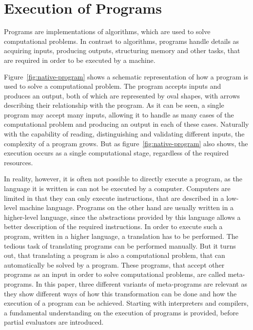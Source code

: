 
\section{Execution of Programs}\label{chap:programs}


Programs are implementations of algorithms, which are used to solve computational problems.
In contrast to algorithms, programs handle details as acquiring inputs, producing outputs, structuring memory and other tasks, that are required in order to be executed by a machine.

Figure~\ref{fig:native-program} shows a schematic representation of how a program is used to solve a computational problem.
The program accepts inputs and produces an output, both of which are represented by oval shapes, with arrows describing their relationship with the program.
As it can be seen, a single program may accept many inputs, allowing it to handle as many cases of the computational problem and producing an output in each of these cases.
Naturally with the capability of reading, distinguishing and validating different inputs, the complexity of a program grows.
But as figure~\ref{fig:native-program} also shows, the execution occurs as a single computational stage, regardless of the required resources.

In reality, however, it is often not possible to directly execute a program, as the language it is written is can not be executed by a computer.
Computers are limited in that they can only execute instructions, that are described in a low-level machine language.
Programs on the other hand are usually written in a higher-level language, since the abstractions provided by this language allows a better description of the required instructions.
In order to execute such a program, written in a higher language, a translation has to be performed.
The tedious task of translating programs can be performed manually.
But it turns out, that translating a program is also a computational problem, that can automatically be solved by a program.
These programs, that accept other programs as an input in order to solve computational problems, are called meta-programs.
In this paper, three different variants of meta-programs are relevant as they show different ways of how this transformation can be done and how the execution of a program can be achieved.
Starting with interpreters and compilers, a fundamental understanding on the execution of programs is provided, before partial evaluators are introduced.

